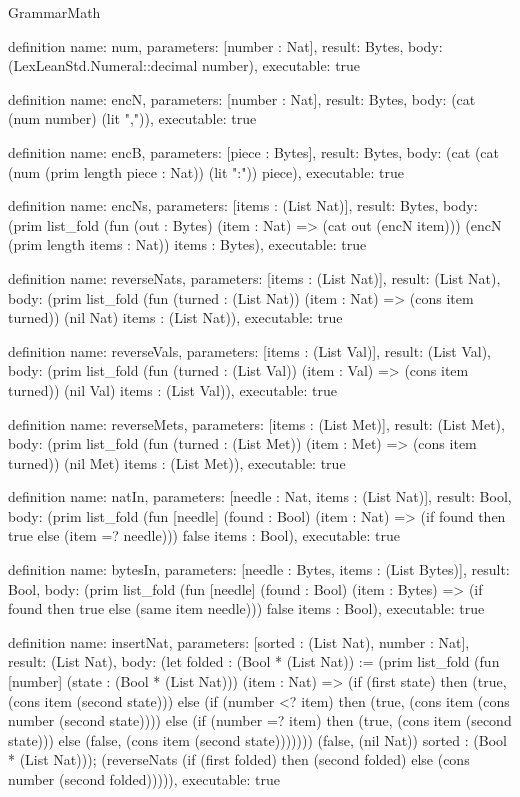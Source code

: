 \begin{lexlean}{GrammarMath}
\begin{semanticmodule}
definition{
  name: num,
  parameters: [number : Nat],
  result: Bytes,
  body: (LexLeanStd.Numeral::decimal number),
  executable: true
}

definition{
  name: encN,
  parameters: [number : Nat],
  result: Bytes,
  body: (cat (num number) (lit ",")),
  executable: true
}

definition{
  name: encB,
  parameters: [piece : Bytes],
  result: Bytes,
  body: (cat (cat (num (prim length piece : Nat)) (lit ":")) piece),
  executable: true
}

definition{
  name: encNs,
  parameters: [items : (List Nat)],
  result: Bytes,
  body: (prim list_fold (fun (out : Bytes) (item : Nat) => (cat out (encN item))) (encN (prim length items : Nat)) items : Bytes),
  executable: true
}

definition{
  name: reverseNats,
  parameters: [items : (List Nat)],
  result: (List Nat),
  body: (prim list_fold (fun (turned : (List Nat)) (item : Nat) => (cons item turned)) (nil Nat) items : (List Nat)),
  executable: true
}

definition{
  name: reverseVals,
  parameters: [items : (List Val)],
  result: (List Val),
  body: (prim list_fold (fun (turned : (List Val)) (item : Val) => (cons item turned)) (nil Val) items : (List Val)),
  executable: true
}

definition{
  name: reverseMets,
  parameters: [items : (List Met)],
  result: (List Met),
  body: (prim list_fold (fun (turned : (List Met)) (item : Met) => (cons item turned)) (nil Met) items : (List Met)),
  executable: true
}

definition{
  name: natIn,
  parameters: [needle : Nat, items : (List Nat)],
  result: Bool,
  body: (prim list_fold (fun [needle] (found : Bool) (item : Nat) => (if found then true else (item =? needle))) false items : Bool),
  executable: true
}

definition{
  name: bytesIn,
  parameters: [needle : Bytes, items : (List Bytes)],
  result: Bool,
  body: (prim list_fold (fun [needle] (found : Bool) (item : Bytes) => (if found then true else (same item needle))) false items : Bool),
  executable: true
}

definition{
  name: insertNat,
  parameters: [sorted : (List Nat), number : Nat],
  result: (List Nat),
  body: (let folded : (Bool * (List Nat)) := (prim list_fold (fun [number] (state : (Bool * (List Nat))) (item : Nat) => (if (first state) then (true, (cons item (second state))) else (if (number <? item) then (true, (cons item (cons number (second state)))) else (if (number =? item) then (true, (cons item (second state))) else (false, (cons item (second state))))))) (false, (nil Nat)) sorted : (Bool * (List Nat))); (reverseNats (if (first folded) then (second folded) else (cons number (second folded))))),
  executable: true
}


\end{semanticmodule}
\end{lexlean}
